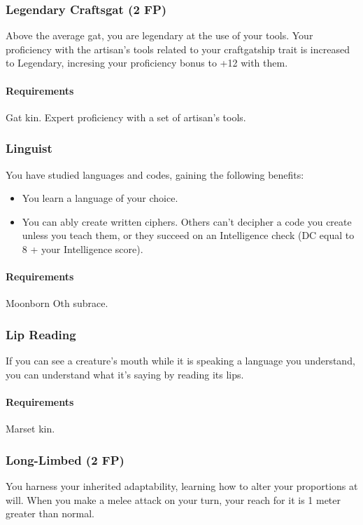 \subsubsection{Legendary Craftsgat (2 FP)} \label{feat::legendarycraftsgat}
    Above the average gat, you are legendary at the use of your tools.
    Your proficiency with the artisan's tools related to your craftgatship trait is increased to Legendary, incresing your proficiency bonus to +12 with them.
    \paragraph{Requirements} Gat kin. Expert proficiency with a set of artisan's tools.
\subsubsection{Linguist} \label{feat::linguist}
    You have studied languages and codes, gaining the following benefits:
    \begin{itemize}
        \item You learn a language of your choice.
        \item You can ably create written ciphers.
        Others can't decipher a code you create unless you teach them, or they succeed on an Intelligence check (DC equal to 8 + your Intelligence score).
    \end{itemize}
    \paragraph{Requirements} Moonborn Oth subrace.
\subsubsection{Lip Reading} \label{feat::lipreading}
    If you can see a creature's mouth while it is speaking a language you understand, you can understand what it's saying by reading its lips.
    \paragraph{Requirements} Marset kin.
\subsubsection{Long-Limbed (2 FP)} \label{feat::longlimbed}
    You harness your inherited adaptability, learning how to alter your proportions at will.
    When you make a melee attack on your turn, your reach for it is 1 meter greater than normal.
